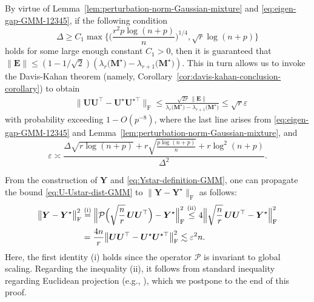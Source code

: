 


By virtue of Lemma~\ref{lem:perturbation-norm-Gaussian-mixture} and \eqref{eq:eigen-gap-GMM-12345}, if the following condition
%
$$\Delta\geq C_{1}\max\Big\{ \Big(\frac{r^{2}p\log(n+p)}{n}\Big)^{1/4},\sqrt{r}\log(n+p) \Big\}$$
%
holds for some large enough constant $C_1>0$, then it is guaranteed that $\|\bm{E}\|\leq (1-1/\sqrt{2}) (\lambda_{r}\big(\bm{M}^{\star}\big)-\lambda_{r+1}\big(\bm{M}^{\star}\big)) $.
This in turn allows us to invoke the Davis-Kahan theorem
(namely, Corollary~\ref{cor:davis-kahan-conclusion-corollary})
to obtain
%
\begin{align}
 & \big\|\bm{U}\bm{U}^{\top}-\bm{U}^{\star}\bm{U}^{\star\top}\big\|_{\mathrm{F}}
 \leq\frac{\sqrt{2r}\,\|\bm{E}\|}{\lambda_{r}\big(\bm{M}^{\star}
 \big)-\lambda_{r+1}\big(\bm{M}^{\star}\big)} \leq \sqrt{r} \varepsilon
\label{eq:U-Ustar-dist-GMM}
\end{align}
%
with probability exceeding $1-O(p^{-8})$,
where the last line arises from \eqref{eq:eigen-gap-GMM-12345}
and Lemma~\ref{lem:perturbation-norm-Gaussian-mixture}, and
\[
	\varepsilon \asymp \frac{\Delta\sqrt{r\log(n+p)}
+ r\sqrt{\frac{p\log(n+p)}{n}} + r \log^{2}(n+p)}{\Delta^{2}}.
\]

From the construction of $\bm{Y}$ and \eqref{eq:Ystar-definition-GMM},
one can propagate the bound \eqref{eq:U-Ustar-dist-GMM} to $\|\bm{Y}-\bm{Y}^{\star}\|_{\mathrm{F}}$ as follows:
%
%
\begin{align}
	\big\|\bm{Y}-\bm{Y}^{\star}\big\|_{\mathrm{F}}^{2} & \overset{\mathrm{(i)}}{=} \Big\|\mathcal{P}\Big(\sqrt{\frac{n}{r}}\,\bm{U}\bm{U}^{\top}\Big)-\bm{Y}^{\star}\Big\|_{\mathrm{F}}^{2}
 \overset{\mathrm{(ii)}}{\leq} 4\Big\|\sqrt{\frac{n}{r}}\,
 \bm{U}\bm{U}^{\top}-\bm{Y}^{\star}\Big\|_{\mathrm{F}}^{2} \notag\\
 & =\frac{4n}{r}\big\|\bm{U}\bm{U}^{\top}-\bm{U}^{\star}
 \bm{U}^{\star\top}\big\|_{\mathrm{F}}^{2}\lesssim \varepsilon^{2}n.
\label{eq:Y-Ystar-dist-GMM}
\end{align}
%
%
%
Here, the first identity (i) holds since the operator $\mathcal{P}$ is invariant to global scaling.
Regarding the inequality (ii),  it follows from standard inequality regarding Euclidean projection (e.g.,
\citet[Lemma~15]{soltanolkotabi2017structured}), which we postpone to the end of this proof.

